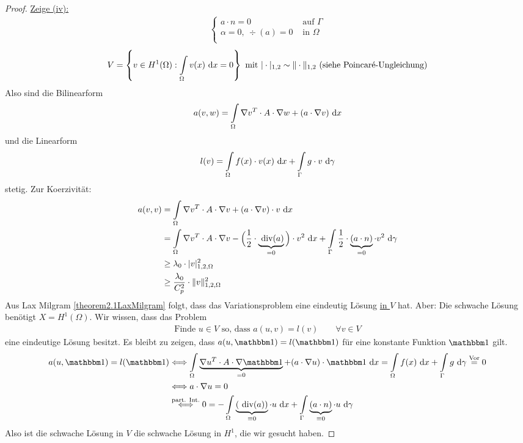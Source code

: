 \begin{proof}
\underline{Zeige (iv):}
\begin{align*}
	\left\{\begin{array}{rl}
a\cdot n=0&\text{ auf }\Gamma\\
\alpha=0,~\div(a)=0&\text{ in  }\Omega\\
\end{array}\right. 
\end{align*}
\begin{align*}
	V=\left\lbrace v\in H^1(\Omega):\int\limits_\Omega v(x)\text{ d} x=0\right\rbrace\text{ mit }|\cdot|_{1,2}\sim\Vert\cdot\Vert_{1,2}\text{ (siehe Poincaré-Ungleichung)}
\end{align*}
Also sind die Bilinearform
\begin{align*}
a(v,w)=\int\limits_\Omega\nabla v^T\cdot A\cdot\nabla w+(a\cdot\nabla v)\text{ d} x
\end{align*}
und die Linearform 
\begin{align*}
l(v)=\int\limits_\Omega f(x)\cdot v(x)\text{ d} x+\int\limits_\Gamma g\cdot v\text{ d}\gamma
\end{align*}
stetig. Zur Koerzivität:
\begin{align*}
a(v,v)&=\int\limits_\Omega\nabla v^T\cdot A\cdot\nabla v+(a\cdot\nabla v)\cdot v\text{ d} x\\
&=\int\limits_\Omega\nabla v^T\cdot A\cdot \nabla v-\Big(\frac{1}{2}\cdot\underbrace{\text{ div}(a)}_{=0}\Big)\cdot v^2\text{ d} x+\int\limits_\Gamma\frac{1}{2}\cdot\underbrace{(a\cdot n)}_{=0}\cdot v^2\text{ d}\gamma\\
&\geq\lambda_0\cdot|v|_{1,2,\Omega}^2\\
&\geq\frac{\lambda_0}{C^2_p}\cdot\Vert v\Vert^2_{1,2,\Omega}
\end{align*}
Aus Lax Milgram \ref{theorem2.1LaxMilgram} folgt, dass das Variationsproblem eine eindeutig Lösung \ul{in $V$} hat. Aber: Die schwache Lösung benötigt $X=H^1(\Omega)$. Wir wissen, dass das Problem
\begin{align*}
\text{Finde $u\in V$ so, dass }a(u,v)=l(v)\qquad\forall v\in V
\end{align*}
eine eindeutige Lösung besitzt. Es bleibt zu zeigen, dass $a(u,\indi)=l(\indi)$ für eine konstante Funktion $\indi$ gilt.
\begin{align*}
a(u,\indi)=l(\indi)
&\Longleftrightarrow
\int\limits_\Omega\underbrace{\nabla u^T\cdot A\cdot\nabla\indi}_{=0}+(a\cdot\nabla u)\cdot\indi\d x
=
\int\limits_\Omega f(x)\d x+\int\limits_\Gamma g\d\gamma\stackeq{\text{Vor}}0\\
&\Longleftrightarrow
a\cdot \nabla u=0\\
&\stackrel{\text{part. Int.}}{\Longleftrightarrow}
0=-\int\limits_\Omega\underbrace{(\div(a))}_{\equiv0}\cdot u\d x+\int\limits_\Gamma\underbrace{(a\cdot n)}_{\equiv 0}\cdot u\d\gamma
\end{align*}
Also ist die schwache Lösung in $V$ die schwache Lösung in $H^1$, die wir gesucht haben.
\end{proof}

